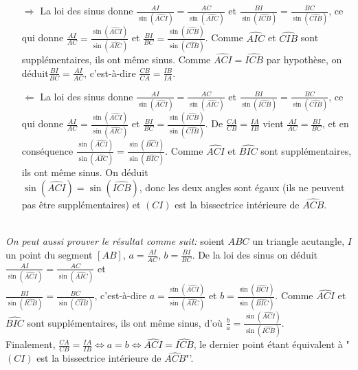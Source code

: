 \begin{sol}[13]
		\begin{itemize}
				\item[$\Rightarrow$] La loi des sinus donne $\frac{AI}{\sin(\widehat{ACI})}=\frac{AC}{\sin(\widehat{AIC})}$ et $\frac{BI}{\sin(\widehat{ICB})}=\frac{BC}{\sin(\widehat{CIB})}$, ce qui donne $\frac{AI}{AC}=\frac{\sin(\widehat{ACI})}{\sin(\widehat{AIC})}$ et $\frac{BI}{BC}=\frac{\sin(\widehat{ICB})}{\sin(\widehat{CIB})}$. Comme $\widehat{AIC}$ et $\widehat{CIB}$ sont suppl\'ementaires, ils ont m\^eme sinus. Comme $\widehat{ACI}=\widehat{ICB}$ par hypoth\`ese, on d\'eduit$\frac{BI}{BC}=\frac{AI}{AC}$, c'est-\`a-dire $\frac{CB}{CA}=\frac{IB}{IA}$. \\
				\item[$\Leftarrow$] La loi des sinus donne $\frac{AI}{\sin(\widehat{ACI})}=\frac{AC}{\sin(\widehat{AIC})}$ et $\frac{BI}{\sin(\widehat{ICB})}=\frac{BC}{\sin(\widehat{CIB})}$, ce qui donne $\frac{AI}{AC}=\frac{\sin(\widehat{ACI})}{\sin(\widehat{AIC})}$ et $\frac{BI}{BC}=\frac{\sin(\widehat{ICB})}{\sin(\widehat{CIB})}$. De $\frac{CA}{CB} = \frac{IA}{IB}$ vient $\frac{AI}{AC}=\frac{BI}{BC}$, et en cons\'equence $\frac{\sin(\widehat{ACI})}{\sin(\widehat{AIC})}=\frac{\sin(\widehat{BCI})}{\sin(\widehat{BIC})}$. Comme $\widehat{ACI}$ et $\widehat{BIC}$ sont suppl\'ementaires, ils ont m\^eme sinus.
				On d\'eduit \\ $\sin(\widehat{ACI})=\sin(\widehat{ICB})$, donc les deux angles sont \'egaux (ils ne peuvent pas \^etre suppl\'ementaires) et $(CI)$ est la bissectrice int\'erieure de $\widehat{ACB}$. 
		\end{itemize}~\\
		\textit{On peut aussi prouver le r\'esultat comme suit:} soient $ABC$ un triangle acutangle, $I$ un point du segment $[AB]$, $a = \frac{AI}{AC}$, $b = \frac{BI}{BC}$. De la loi des sinus on d\'eduit $\frac{AI}{\sin(\widehat{ACI})}=\frac{AC}{\sin(\widehat{AIC})}$ et \\ $\frac{BI}{\sin(\widehat{ICB})}=\frac{BC}{\sin(\widehat{CIB})}$, c'est-\`a-dire $a = \frac{\sin(\widehat{ACI})}{\sin(\widehat{AIC})}$ et $b=\frac{\sin(\widehat{BCI})}{\sin(\widehat{BIC})}$. Comme $\widehat{ACI}$ et $\widehat{BIC}$ sont suppl\'ementaires, ils ont m\^eme sinus, d'o\`u $\frac{b}{a}=\frac{\sin(\widehat{ACI})}{\sin(\widehat{ICB})}$. \\
		Finalement, $\frac{CA}{CB}=\frac{IA}{IB} \Leftrightarrow a = b \Leftrightarrow \widehat{ACI}=\widehat{ICB}$, le dernier point \'etant \'equivalent \`a "$(CI)$ est la bissectrice int\'erieure de $\widehat{ACB}$"'.
\end{sol}

